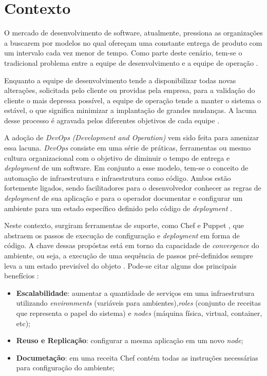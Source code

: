 \section{Contexto}
\label{sec:contexto}

O mercado de desenvolvimento de software, atualmente, pressiona as organizações
a buscarem por modelos no qual ofereçam uma constante entrega de produto com
um intervalo cada vez menor de tempo. Como parte deste cenário, tem-se o
tradicional problema entre a equipe de desenvolvimento e a equipe de operação
\cite{hummer:2013}.

Enquanto a equipe de desenvolvimento tende a disponibilizar todas novas alterações,
solicitada pelo cliente ou providas pela empresa, para a validação do cliente o
mais depressa possível, a equipe de operação tende a manter o sistema o estável,
o que significa minimizar a implantação de grandes mudanças. A lacuna desse
processo é agravada pelos diferentes objetivos de cada equipe
\cite{huttermann:2012}.

A adoção de \textit{DevOps} \textit{(Development and Operation)} vem sido feita
para amenizar essa lacuna. \textit{DevOps} consiste em uma série de práticas,
ferramentas ou mesmo cultura organizacional com o objetivo de diminuir o tempo
de entrega e \textit{deployment} de um software. Em conjunto a
esse modelo, tem-se o conceito de automação de infraestrutura e infraestrutura
como código. Ambos estão fortemente ligados, sendo facilitadores para o
desenvolvedor conhecer as regras de \textit{deployment} de sua aplicação
e para o operador documentar e configurar um ambiente para um estado específico
definido pelo código de \textit{deployment} \cite{hummer:2013}.

Neste contexto, surgiram ferramentas de suporte, como Chef \cite{chef:2016} e
Puppet \cite{puppet:2016}, que abstraem os passos de execução de configuração
e \textit{deployment} em forma de código. A chave dessas propóstas está em torno
da capacidade de \textit{convergence} do ambiente, ou seja, a execução de uma
sequência de passos pré-definidos sempre leva a um estado previsível do objeto
\cite{hummer:2013}. Pode-se citar alguns dos principais benefícios
\cite{vasiliev:2014}:

\begin{itemize}
  \item \textbf{Escalabilidade}: aumentar a quantidade de serviços em uma infraestrutura
    utilizando \textit{environments} (variáveis para ambientes),\textit{roles}
    (conjunto de receitas que representa o papel do sistema) e \textit{nodes}
    (máquina física, virtual, container, etc);
  \item \textbf{Reuso e Replicação}: configurar a mesma aplicação em um novo \textit{node};
  \item \textbf{Documetação}: em uma receita Chef contém todas as instruções necessárias
    para configuração do ambiente;
\end{itemize}

